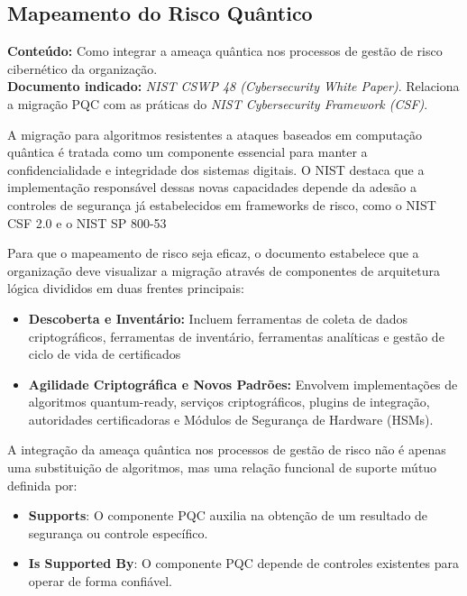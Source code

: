     \subsection{Mapeamento do Risco Quântico}
        \textbf{Conteúdo:} Como integrar a ameaça quântica nos processos de gestão de risco cibernético da organização.\\
        \textbf{Documento indicado:} \textit{NIST CSWP 48 (Cybersecurity White Paper)}. Relaciona a migração PQC com as práticas do \textit{NIST Cybersecurity Framework (CSF)}.

        A migração para algoritmos resistentes a ataques baseados em computação quântica é tratada como um componente essencial para manter a confidencialidade e integridade dos sistemas digitais. O NIST destaca que a implementação responsável dessas novas capacidades depende da adesão a controles de segurança já estabelecidos em frameworks de risco, como o NIST CSF 2.0 e o NIST SP 800-53\cite{nistCSWP48}

        Para que o mapeamento de risco seja eficaz, o documento estabelece que a organização deve visualizar a migração através de componentes de arquitetura lógica divididos em duas frentes principais:

        \begin{itemize}
            \item \textbf{Descoberta e Inventário:} Incluem ferramentas de coleta de dados criptográficos, ferramentas de inventário, ferramentas analíticas e gestão de ciclo de vida de certificados
            \item \textbf{Agilidade Criptográfica e Novos Padrões:} Envolvem implementações de algoritmos quantum-ready, serviços criptográficos, plugins de integração, autoridades certificadoras e Módulos de Segurança de Hardware (HSMs).
        \end{itemize}\cite{nistCSWP48}

        A integração da ameaça quântica nos processos de gestão de risco não é apenas uma substituição de algoritmos, mas uma relação funcional de suporte mútuo definida por:

        \begin{itemize}
            \item \textbf{Supports}: O componente PQC auxilia na obtenção de um resultado de segurança ou controle específico.
            \item \textbf{Is Supported By}: O componente PQC depende de controles existentes para operar de forma confiável.
        \end{itemize}\cite{nistCSWP48}

